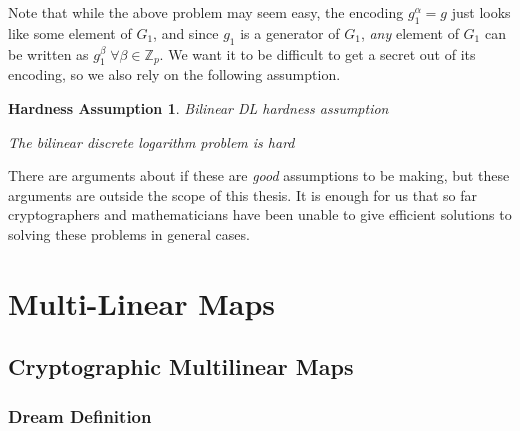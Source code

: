 \documentclass[12pt,twoside]{reedthesis}
\newtheorem{assumption}{Hardness Assumption}
\newcommand{\Z}[0]{\mathbb{Z}}
\begin{document}
    Note that while the above problem may seem easy, the encoding $g_1^\alpha = g $ just looks like some element of $G_1$, and since $g_1$ is a generator of $G_1$, \textit{any} element of $G_1$ can be written as $g_1^\beta \; \forall \beta \in \Z_p$. We want it to be difficult to get a secret out of its encoding, so we also rely on the following assumption.
    
    \begin{assumption}{Bilinear DL hardness assumption}
    \par The bilinear discrete logarithm problem is hard
    \end{assumption}
   
    
   \par There are arguments about if these are \textit{good} assumptions to be making, but these arguments are outside the scope of this thesis. It is enough for us that so far cryptographers and mathematicians have been unable to give efficient solutions to solving these problems in general cases.
    
    
    \chapter{Multi-Linear Maps}
    
    \section{Cryptographic Multilinear Maps}
    
    
    \subsection{Dream Definition}
    
\end{document}
